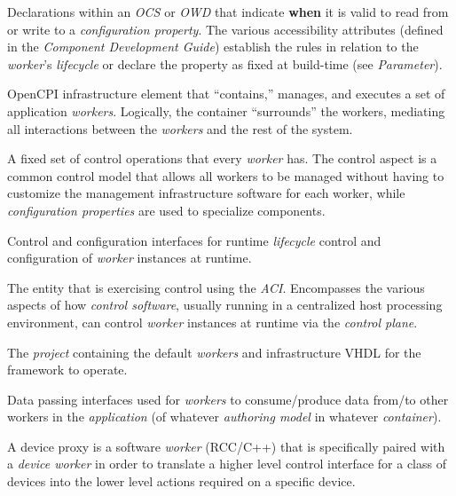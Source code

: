\begin{description}[style=nextline]
\item[Configuration Property Accessibility]
Declarations within an \textit{OCS} or \textit{OWD} that indicate \textbf{when} it is valid to read from or write to a \textit{configuration property}.
The various accessibility attributes (defined in the \textit{Component Development Guide}) establish the rules in relation to the \textit{worker}'s \textit{lifecycle} or declare the property as fixed at build-time (see \textit{Parameter}).

\item[Containers]
OpenCPI infrastructure element that ``contains,'' manages, and executes a set of application \textit{workers}. Logically, the container ``surrounds'' the workers, mediating all interactions between the \textit{workers} and the rest of the system.

\item[Control Operations]
A fixed set of control operations that every \textit{worker} has. The control aspect is a common control model that allows all workers to be managed without having to customize the management infrastructure software for each worker, while \textit{configuration properties} are used to specialize components.

\item[Control Plane]
Control and configuration interfaces for runtime \textit{lifecycle} control and configuration of \textit{worker} instances at runtime.

\item[Control Software (AKA Control Application AKA Control Agent)]
The entity that is exercising control using the \textit{ACI}. Encompasses the various aspects of how \textit{control software}, usually running in a centralized host processing environment, can control \textit{worker} instances at runtime via the \textit{control plane}.

\item[Core]
The \textit{project} containing the default \textit{workers} and infrastructure VHDL for the framework to operate.

\item[Data Plane]
Data passing interfaces used for \textit{workers} to consume/produce data from/to other workers in the \textit{application} (of whatever \textit{authoring model} in whatever \textit{container}).

\item[Device Proxy]
A device proxy is a software \textit{worker} (RCC/C++) that is specifically paired with a \textit{device worker} in order to translate a higher level control interface for a class of devices into the lower level actions required on a specific device.


\end{description}
